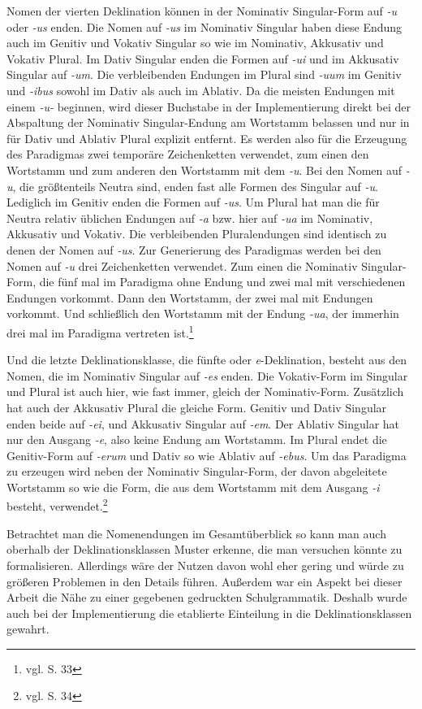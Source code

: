 \documentclass[fontsize=12pt,abstract=on,titlepage,bibliography=totoc,ngerman,listof=totoc]{scrreprt}
\begin{document}
Nomen der vierten Deklination können in der Nominativ Singular-Form auf \textit{-u} oder \textit{-us} enden. Die Nomen auf \textit{-us} im Nominativ Singular haben diese Endung auch im Genitiv und Vokativ Singular so wie im Nominativ, Akkusativ und Vokativ Plural. Im Dativ Singular enden die Formen auf \textit{-ui} und im Akkusativ Singular auf \textit{-um}. Die verbleibenden Endungen im Plural sind \textit{-uum} im Genitiv und \textit{-ibus} sowohl im Dativ als auch im Ablativ. Da die meisten Endungen mit einem \textit{-u-} beginnen, wird dieser Buchstabe in der Implementierung direkt bei der Abspaltung der Nominativ Singular-Endung am Wortstamm belassen und nur in für Dativ und Ablativ Plural explizit entfernt. Es werden also für die Erzeugung des Paradigmas zwei temporäre Zeichenketten verwendet, zum einen den Wortstamm und zum anderen den Wortstamm mit dem \textit{-u}. Bei den Nomen auf \textit{-u}, die größtenteils Neutra sind, enden fast alle Formen des Singular auf \textit{-u}. Lediglich im Genitiv enden die Formen auf \textit{-us}. Um Plural hat man die für Neutra relativ üblichen Endungen auf \textit{-a} bzw. hier auf \textit{-ua} im Nominativ, Akkusativ und Vokativ. Die verbleibenden Pluralendungen sind identisch zu denen der Nomen auf \textit{-us}. Zur Generierung des Paradigmas werden bei den Nomen auf \textit{-u} drei Zeichenketten verwendet. Zum einen die Nominativ Singular-Form, die fünf mal im Paradigma ohne Endung und zwei mal mit verschiedenen Endungen vorkommt. Dann den Wortstamm, der zwei mal mit Endungen vorkommt. Und schließlich den Wortstamm mit der Endung \textit{-ua}, der immerhin drei mal im Paradigma vertreten ist.\footnote{vgl. \cite{BAYER-LINDAUER1994} S. 33} \par
Und die letzte Deklinationsklasse, die fünfte oder \textit{e}-Deklination, besteht aus den Nomen, die im Nominativ Singular auf \textit{-es} enden. Die Vokativ-Form im Singular und Plural ist auch hier, wie fast immer, gleich der Nominativ-Form. Zusätzlich hat auch der Akkusativ Plural die gleiche Form. Genitiv und Dativ Singular enden beide auf \textit{-ei}, und Akkusativ Singular auf \textit{-em}. Der Ablativ Singular hat nur den Ausgang \textit{-e}, also keine Endung am Wortstamm. Im Plural endet die Genitiv-Form auf \textit{-erum} und Dativ so wie Ablativ auf \textit{-ebus}. Um das Paradigma zu erzeugen wird neben der Nominativ Singular-Form, der davon abgeleitete Wortstamm so wie die Form, die aus dem Wortstamm mit dem Ausgang \textit{-i} besteht, verwendet.\footnote{vgl. \cite{BAYER-LINDAUER1994} S. 34} \par
Betrachtet man die Nomenendungen im Gesamtüberblick so kann man auch oberhalb der Deklinationsklassen Muster erkenne, die man versuchen könnte zu formalisieren. Allerdings wäre der Nutzen davon wohl eher gering und würde zu größeren Problemen in den Details führen. Außerdem war ein Aspekt bei dieser Arbeit die Nähe zu einer gegebenen gedruckten Schulgrammatik. Deshalb wurde auch bei der Implementierung die etablierte Einteilung in die Deklinationsklassen gewahrt.
\end{document}
